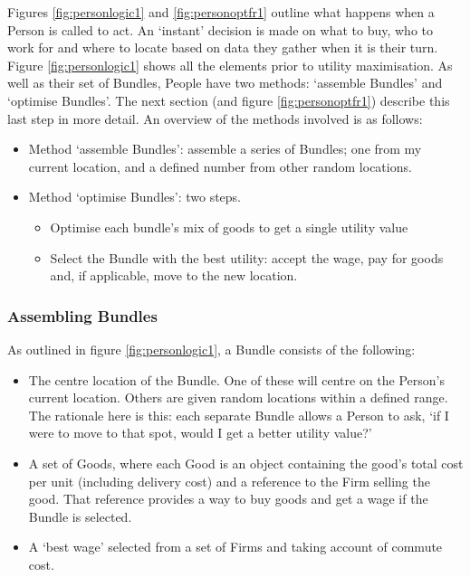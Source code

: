 
Figures \ref{fig:personlogic1} and \ref{fig:personoptfr1} outline what happens when a Person is called to act. An `instant' decision is made on what to buy, who to work for and where to locate based on data they gather when it is their turn. Figure \ref{fig:personlogic1} shows all the elements prior to utility maximisation. As well as their set of Bundles, People have two methods: `assemble Bundles' and `optimise Bundles'. The next section (and figure \ref{fig:personoptfr1}) describe this last step in more detail. An overview of the methods involved is as follows: 

\begin{itemize}
	\item Method `assemble Bundles': assemble a series of Bundles; one from my current location, and a defined number from other random locations.
\item Method `optimise Bundles': two steps. 
\begin{itemize}
	\item Optimise each bundle's mix of goods to get a single utility value
	\item Select the Bundle with the best utility: accept the wage, pay for goods and, if applicable, move to the new location.
\end{itemize}
\end{itemize}


\subsubsection{Assembling Bundles}

As outlined in figure \ref{fig:personlogic1}, a Bundle consists of the following: 

\begin{itemize}
	\item The centre location of the Bundle. One of these will centre on the Person's current location. Others are given random locations within a defined range. The rationale here is this: each separate Bundle allows a Person to ask, `if I were to move to that spot, would I get a better utility value?'
	\item A set of Goods, where each Good is an object containing the good's total cost per unit (including delivery cost) and a reference to the Firm selling the good. That reference provides a way to buy goods and get a wage if the Bundle is selected.
	\item A `best wage' selected from a set of Firms and taking account of commute cost.
\end{itemize}

